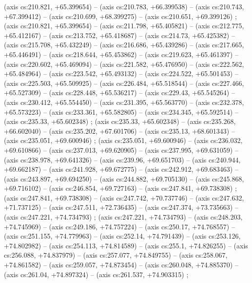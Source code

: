     (axis cs:210.821,    +65.399654) --  (axis cs:210.783,    +66.399538) --  (axis cs:210.743,    +67.399412) --  (axis cs:210.699,    +68.399275) --  (axis cs:210.651,    +69.399126) ;
    (axis cs:210.821,    +65.399654) --  (axis cs:211.798,    +65.405821) --  (axis cs:212.775,    +65.412167) --  (axis cs:213.752,    +65.418687) --  (axis cs:214.73,    +65.425382) --  (axis cs:215.708,    +65.432249) --  (axis cs:216.686,    +65.439286) --  (axis cs:217.665,    +65.446491) --  (axis cs:218.644,    +65.453862) --  (axis cs:219.623,    +65.461397) --  (axis cs:220.602,    +65.469094) --  (axis cs:221.582,    +65.476950) --  (axis cs:222.562,    +65.484964) --  (axis cs:223.542,    +65.493132) --  (axis cs:224.522,    +65.501453) --  (axis cs:225.503,    +65.509925) --  (axis cs:226.484,    +65.518544) --  (axis cs:227.466,    +65.527309) --  (axis cs:228.448,    +65.536217) --  (axis cs:229.43,    +65.545264) --  (axis cs:230.412,    +65.554450) --  (axis cs:231.395,    +65.563770) --  (axis cs:232.378,    +65.573223) --  (axis cs:233.361,    +65.582805) --  (axis cs:234.345,    +65.592514) --  (axis cs:235.33,    +65.602348) ;
    (axis cs:235.33,    +65.602348) --  (axis cs:235.268,    +66.602040) --  (axis cs:235.202,    +67.601706) --  (axis cs:235.13,    +68.601343) --  (axis cs:235.051,    +69.600946) ;
    (axis cs:235.051,    +69.600946) --  (axis cs:236.032,    +69.610866) --  (axis cs:237.013,    +69.620905) --  (axis cs:237.995,    +69.631059) --  (axis cs:238.978,    +69.641326) --  (axis cs:239.96,    +69.651703) --  (axis cs:240.944,    +69.662187) --  (axis cs:241.928,    +69.672775) --  (axis cs:242.912,    +69.683463) --  (axis cs:243.897,    +69.694250) --  (axis cs:244.882,    +69.705130) --  (axis cs:245.868,    +69.716102) --  (axis cs:246.854,    +69.727163) --  (axis cs:247.841,    +69.738308) ;
    (axis cs:247.841,    +69.738308) --  (axis cs:247.742,    +70.737746) --  (axis cs:247.632,    +71.737125) --  (axis cs:247.511,    +72.736435) --  (axis cs:247.374,    +73.735663) --  (axis cs:247.221,    +74.734793) ;
    (axis cs:247.221,    +74.734793) --  (axis cs:248.203,    +74.745969) --  (axis cs:249.186,    +74.757224) --  (axis cs:250.17,    +74.768557) --  (axis cs:251.155,    +74.779963) --  (axis cs:252.14,    +74.791439) --  (axis cs:253.126,    +74.802982) --  (axis cs:254.113,    +74.814589) --  (axis cs:255.1,    +74.826255) --  (axis cs:256.088,    +74.837979) --  (axis cs:257.077,    +74.849755) --  (axis cs:258.067,    +74.861582) --  (axis cs:259.057,    +74.873454) --  (axis cs:260.048,    +74.885370) --  (axis cs:261.04,    +74.897324) --  (axis cs:261.537,    +74.903315) ;
